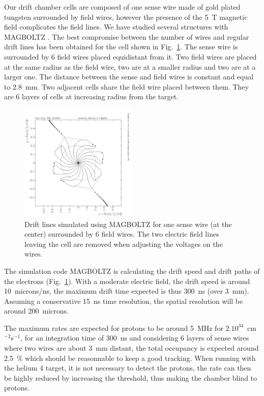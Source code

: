 Our drift chamber cells are composed of one sense wire made of gold plated tungsten surrounded by field wires, however the presence of the 5~T magnetic field complicates the field lines. We have studied several structures with MAGBOLTZ \cite{Magboltz}. The best compromise between the number of wires and regular drift lines has been obtained for the cell shown in Fig.~\ref{fig:drift_cell}. The sense wire is surrounded by 6 field wires placed equidistant from it. Two field wires are placed at the same radius as the field wire, two are at a smaller radius and two are at a larger one. The distance between the sense and field wires is constant and equal to 2.8~mm. Two adjacent cells share the field wire placed between them. They are 6 layers of cells at increasing radius from the target. \\

\begin{figure}
  \begin{center}
    \includegraphics[angle=0, width=0.5\textwidth]{./../Detector/fig-chap2/HEISOE.pdf}
    \caption{Drift lines simulated using MAGBOLTZ \cite{Magboltz} for one sense wire (at the center) surrounded by 6 field wires. The two electric field lines leaving the cell are removed when adjusting the voltages on the wires.}
    \label{fig:drift_cell}
  \end{center}
\end{figure}

The simulation code MAGBOLTZ is calculating the drift speed and drift paths of the electrons (Fig.~\ref{fig:drift_cell}). With a moderate electric field, the drift speed is around 10~microns/ns, the maximum drift time expected is thus 300~ns (over 3~mm). Assuming a conservative 15~ns time resolution, the spatial resolution will be around 200~microns. 

The maximum rates are expected for protons to be around 5~MHz for $2.10^{34}$~cm$^{-2}$s$^{-1}$, for an integration time of 300~ns and considering 6 layers of sense wires where two wires are about 3~mm distant, the total occupancy is expected around 2.5~\% which should be reasonnable to keep a good tracking. When running with the helium 4 target, it is not necessary to detect the protons, the rate can then be highly reduced by increasing the threshold, thus making the chamber blind to protons. \\

